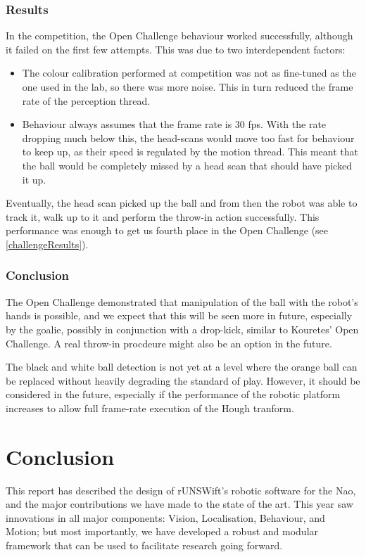 \documentclass[pdftex,11pt,a4paper]{report}
\begin{document}
\subsection{Results}
In the competition, the Open Challenge behaviour worked successfully,
although it failed on the first few attempts. This was due to two
interdependent factors:
\begin{itemize}
    \item The colour calibration performed at competition was not as
        fine-tuned as the one used in the lab, so there was more noise.
        This in turn reduced the frame rate of the perception thread.
    \item Behaviour always assumes that the frame rate is 30 fps. With the
        rate dropping much below this, the head-scans would move too fast
        for behaviour to keep up, as their speed is regulated by the motion
        thread. This meant that the ball would be completely missed by a
        head scan that should have picked it up.
\end{itemize}
Eventually, the head scan picked up the ball and from then the robot was
able to track it, walk up to it and perform the throw-in action
successfully. This performance was enough to get us fourth place in the
Open Challenge (see \autoref{challengeResults}).
\subsection{Conclusion}
The Open Challenge demonstrated that manipulation of the ball with the
robot's hands is possible, and we expect that this will be seen more in
future, especially by the goalie, possibly in conjunction with a drop-kick,
similar to Kouretes' Open Challenge. A real throw-in procdeure might also
be an option in the future.

The black and white ball detection is not yet at a level where the orange
ball can be replaced without heavily degrading the standard of play.
However, it should be considered in the future, especially if the
performance of the robotic platform increases to allow full frame-rate
execution of the Hough tranform.

		
\newpage
\chapter{Conclusion}

This report has described the design of rUNSWift's robotic software for the Nao, and the major contributions we have made to the state of the art. This year saw innovations in all major components: Vision, Localisation, Behaviour, and Motion; but most importantly, we have developed a robust and modular framework that can be used to facilitate research going forward.
\end{document}
